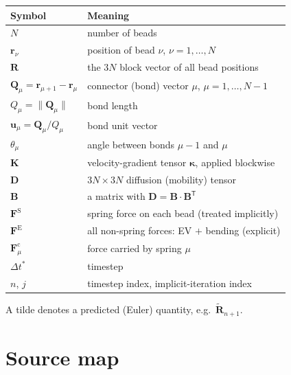 \documentclass[11pt,a4paper]{report}
\newcommand{\D}{\bm{D}}
\newcommand{\B}{\bm{B}}
\newcommand{\R}{\bm{R}}
\newcommand{\Q}{\bm{Q}}
\newcommand{\uv}{\bm{u}}
\newcommand{\dt}{\Delta t^{*}}
\begin{document}
\begin{longtable}{@{}p{}p{}@{}}
\toprule
Symbol & Meaning \\
\midrule
\endhead
$N$ & number of beads \\
$\bm{r}_\nu$ & position of bead $\nu$, $\nu = 1,\dots,N$ \\
$\R$ & the $3N$ block vector of all bead positions \\
$\Q_\mu = \bm{r}_{\mu+1}-\bm{r}_\mu$ & connector (bond) vector $\mu$, $\mu = 1,\dots,N-1$ \\
$Q_\mu = \|\Q_\mu\|$ & bond length \\
$\uv_\mu = \Q_\mu/Q_\mu$ & bond unit vector \\
$\theta_\mu$ & angle between bonds $\mu-1$ and $\mu$ \\
$\bm{K}$ & velocity-gradient tensor $\bm{\kappa}$, applied blockwise \\
$\D$ & $3N\times3N$ diffusion (mobility) tensor \\
$\B$ & a matrix with $\D = \B\cdot\B^{\mathsf{T}}$ \\
$\bm{F}^{\mathrm{S}}$ & spring force on each bead (treated implicitly) \\
$\bm{F}^{\mathrm{E}}$ & all non-spring forces: EV $+$ bending (explicit) \\
$\bm{F}^{\mathrm{c}}_\mu$ & force carried by spring $\mu$ \\
$\dt$ & timestep \\
$n$, $j$ & timestep index, implicit-iteration index \\
\bottomrule
\end{longtable}

A tilde denotes a predicted (Euler) quantity, e.g.\ $\tilde{\R}_{n+1}$.

\section{Source map}
\end{document}
